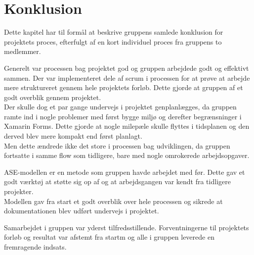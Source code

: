 \chapter{Konklusion}
Dette kapitel har til formål at beskrive gruppens samlede konklusion for projektets proces, efterfulgt af en kort individuel proces fra gruppens to medlemmer. 

Generelt var processen bag projektet god og gruppen arbejdede godt og effektivt sammen.
Der var implementeret dele af scrum i processen for at prøve at arbejde mere struktureret gennem hele projektets forløb. Dette gjorde at gruppen af et godt overblik gennem projektet. \\
Der skulle dog et par gange undervejs i projektet genplanlægges, da gruppen ramte ind i nogle problemer med først bygge miljø og derefter begrænsninger i Xamarin Forms. Dette gjorde at nogle milepæle skulle flyttes i tidsplanen og den derved blev mere kompakt end først planlagt. \\
Men dette ændrede ikke det store i processen bag udviklingen, da gruppen fortsatte i samme flow som tidligere, bare med nogle omrokerede arbejdsopgaver.

ASE-modellen er en metode som gruppen havde arbejdet med før. Dette gav et godt værktøj at støtte sig op af og at arbejdsgangen var kendt fra tidligere projekter. \\
Modellen gav fra start et godt overblik over hele processen og sikrede at dokumentationen blev udført undervejs i projektet.

Samarbejdet i gruppen var yderst tilfredsstillende. Forventningerne til projektets forløb og resultat var afstemt fra startm og alle i gruppen leverede en fremragende indsats.

%
%